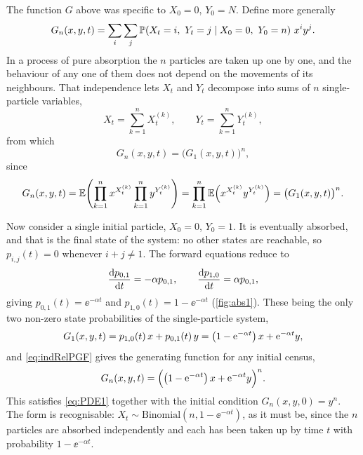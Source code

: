 The function $G$ above was specific to $X_0=0$, $Y_0=N$. Define more generally
\begin{equation*}
G_n(x,y,t) = \sum_i\sum_j\mathbb{P}\!\left(X_t=i,\ Y_t=j \mid X_0=0,\ Y_0=n\right)\,x^iy^j .
\end{equation*}
In a process of pure absorption the $n$ particles are taken up one by one, and the
behaviour of any one of them does not depend on the movements of its neighbours.
That independence lets $X_t$ and $Y_t$ decompose into sums of $n$ single-particle
variables,
\begin{equation*}
X_t = \sum_{k=1}^{n}X_t^{(k)},
\qquad
Y_t = \sum_{k=1}^{n}Y_t^{(k)},
\end{equation*}
from which
\begin{equation}
\label{eq:indRelPGF}
G_n(x,y,t) = \bigl(G_1(x,y,t)\bigr)^n ,
\end{equation}
since
\begin{equation*}
G_n(x,y,t)
= \mathbb{E}\!\left(\prod_{k=1}^{n}x^{X_t^{(k)}}\prod_{k=1}^{n}y^{Y_t^{(k)}}\right)
= \prod_{k=1}^{n}\mathbb{E}\!\left(x^{X_t^{(k)}}y^{Y_t^{(k)}}\right)
= \bigl(G_1(x,y,t)\bigr)^n .
\end{equation*}

Now consider a single initial particle, $X_0=0$, $Y_0=1$. It is eventually
absorbed, and that is the final state of the system: no other states are reachable,
so $p_{i,j}(t)=0$ whenever $i+j\neq1$. The forward equations reduce to
\begin{equation*}
\frac{\mathrm{d} p_{0,1}}{\mathrm{d} t} = -\alpha p_{0,1},
\qquad
\frac{\mathrm{d} p_{1,0}}{\mathrm{d} t} = \alpha p_{0,1},
\end{equation*}
giving $p_{0,1}(t) = \ee^{-\alpha t}$ and $p_{1,0}(t) = 1-\ee^{-\alpha t}$
(\cref{fig:abs1}). These being the only two non-zero state probabilities of the
single-particle system,
\begin{equation*}
G_1(x,y,t) = p_{1,0}(t)\,x + p_{0,1}(t)\,y
= \left(1-\mathrm{e}^{-\alpha t}\right)x + \mathrm{e}^{-\alpha t}y ,
\end{equation*}
and \cref{eq:indRelPGF} gives the generating function for any initial census,
\begin{equation}
\label{eq:Gabsonly}
G_n(x,y,t) = \Bigl(\left(1-\mathrm{e}^{-\alpha t}\right)x + \mathrm{e}^{-\alpha t}y\Bigr)^n .
\end{equation}
This satisfies \cref{eq:PDE1} together with the initial condition
$G_n(x,y,0)=y^n$. The form is recognisable: $X_t\sim\text{Binomial}(n,1-\ee^{-\alpha t})$,
as it must be, since the $n$ particles are absorbed independently and each has been
taken up by time $t$ with probability $1-\ee^{-\alpha t}$.

